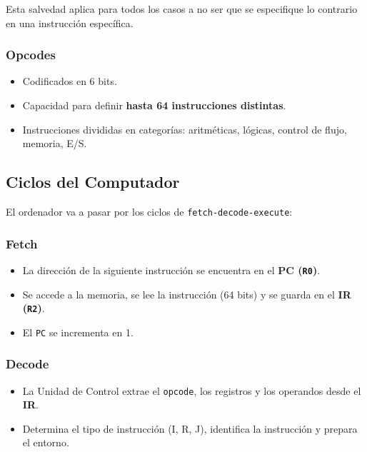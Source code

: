 \documentclass{article}
\begin{document}
Esta salvedad aplica para todos los casos a no ser que se especifique lo contrario en una instrucción específica.

\subsubsection{Opcodes}

\begin{itemize}
    \item Codificados en 6 bits.
    \item Capacidad para definir \textbf{hasta 64 instrucciones distintas}.
    \item Instrucciones divididas en categorías: aritméticas, lógicas, control de flujo, memoria, E/S.
\end{itemize}


\subsection{Ciclos del Computador}

El ordenador va a pasar por los ciclos de \texttt{fetch-decode-execute}:

\subsubsection{Fetch}

\begin{itemize}
    \item La dirección de la siguiente instrucción se encuentra en el \textbf{PC (\texttt{R0})}.
    \item Se accede a la memoria, se lee la instrucción (64 bits) y se guarda en el \textbf{IR (\texttt{R2})}.
    \item El \texttt{PC} se incrementa en 1.
\end{itemize}

\subsubsection{Decode}

\begin{itemize}
    \item La Unidad de Control extrae el \texttt{opcode}, los registros y los operandos desde el \textbf{IR}.
    \item Determina el tipo de instrucción (I, R, J), identifica la instrucción y prepara el entorno.
\end{itemize}
\end{document}
